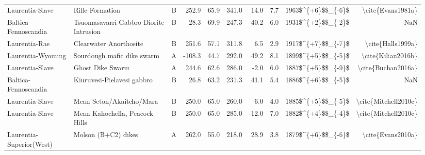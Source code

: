 \begin{longtable}{p{1 in}p{1 in}rrrrrrrr}
               Laurentia-Slave &                                    Rifle Formation &      B &     252.9 &      65.9 & 341.0 &  14.0 &       7.7 &     1963\$\textasciicircum \{+6\}\$\$\_\{-6\}\$ &                                  \textbackslash cite\{Evans1981a\} \\
          Baltica-Fennoscandia &             Tsuomasavarri Gabbro-Diorite Intrusion &      B &      28.3 &      69.9 & 247.3 &  40.2 &       6.0 &     1931\$\textasciicircum \{+2\}\$\$\_\{-2\}\$ &                                                NaN \\
                 Laurentia-Rae &                             Clearwater Anorthosite &      B &     251.6 &      57.1 & 311.8 &   6.5 &       2.9 &     1917\$\textasciicircum \{+7\}\$\$\_\{-7\}\$ &                                  \textbackslash cite\{Halls1999a\} \\
             Laurentia-Wyoming &                         Sourdough mafic dike swarm &      A &    -108.3 &      44.7 & 292.0 &  49.2 &       8.1 &     1899\$\textasciicircum \{+5\}\$\$\_\{-5\}\$ &                                 \textbackslash cite\{Kilian2016b\} \\
               Laurentia-Slave &                                   Ghost Dike Swarm &      A &     244.6 &      62.6 & 286.0 &  -2.0 &       6.0 &     1887\$\textasciicircum \{+5\}\$\$\_\{-9\}\$ &                                 \textbackslash cite\{Buchan2016a\} \\
          Baltica-Fennoscandia &                         Kiuruvesi-Pielavesi gabbro &      B &      26.8 &      63.2 & 231.3 &  41.1 &       5.4 &     1886\$\textasciicircum \{+6\}\$\$\_\{-5\}\$ &                                                NaN \\
               Laurentia-Slave &                           Mean Seton/Akaitcho/Mara &      B &     250.0 &      65.0 & 260.0 &  -6.0 &       4.0 &     1885\$\textasciicircum \{+5\}\$\$\_\{-5\}\$ &                               \textbackslash cite\{Mitchell2010c\} \\
               Laurentia-Slave &                     Mean Kahochella, Peacock Hills &      B &     250.0 &      65.0 & 285.0 & -12.0 &       7.0 &     1882\$\textasciicircum \{+4\}\$\$\_\{-4\}\$ &                               \textbackslash cite\{Mitchell2010c\} \\
      Laurentia-Superior(West) &                                Molson (B+C2) dikes &      A &     262.0 &      55.0 & 218.0 &  28.9 &       3.8 &     1879\$\textasciicircum \{+6\}\$\$\_\{-6\}\$ &                                  \textbackslash cite\{Evans2010a\} \\

\end{longtable}
